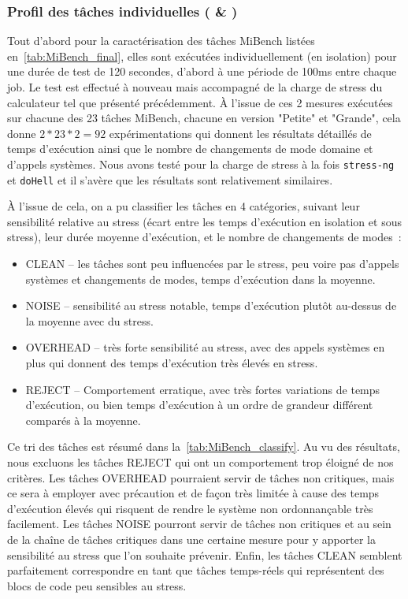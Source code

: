\documentclass[french, a4paper, 11pt, twoside, pdftex]{StyleThese}
\begin{document}
\subsubsection{Profil des tâches individuelles ( \& )}
Tout d'abord pour la caractérisation des tâches MiBench listées en~\autoref{tab:MiBench_final}, elles sont exécutées individuellement (en isolation) pour une durée de test de 120 secondes, d'abord à une période de 100ms entre chaque job. Le test est effectué à nouveau mais accompagné de la charge de stress du calculateur tel que présenté précédemment. À l'issue de ces 2 mesures exécutées sur chacune des 23 tâches MiBench, chacune en version "Petite" et "Grande", cela donne $2*23*2 = 92$ expérimentations qui donnent les résultats détaillés de temps d'exécution ainsi que le nombre de changements de mode domaine et d'appels systèmes. Nous avons testé pour la charge de stress à la fois \texttt{stress-ng} et \texttt{doHell} et il s'avère que les résultats sont relativement similaires.

À l'issue de cela, on a pu classifier les tâches en 4 catégories, suivant leur sensibilité relative au stress (écart entre les temps d'exécution en isolation et sous stress), leur durée moyenne d'exécution, et le nombre de changements de modes~: 
\begin{itemize}
	\item CLEAN -- les tâches sont peu influencées par le stress, peu voire pas d'appels systèmes et changements de modes, temps d'exécution dans la moyenne.
	\item NOISE -- sensibilité au stress notable, temps d'exécution plutôt au-dessus de la moyenne avec du stress.
	\item OVERHEAD -- très forte sensibilité au stress, avec des appels systèmes en plus qui donnent des temps d'exécution très élevés en stress.
	\item REJECT -- Comportement erratique, avec très fortes variations de temps d'exécution, ou bien temps d'exécution à un ordre de grandeur différent comparés à la moyenne.
\end{itemize}
Ce tri des tâches est résumé dans la~\autoref{tab:MiBench_classify}. Au vu des résultats, nous excluons les tâches REJECT qui ont un comportement trop éloigné de nos critères. Les tâches OVERHEAD pourraient servir de tâches non critiques, mais ce sera à employer avec précaution et de façon très limitée à cause des temps d'exécution élevés qui risquent de rendre le système non ordonnançable très facilement. Les tâches NOISE pourront servir de tâches non critiques et au sein de la chaîne de tâches critiques dans une certaine mesure pour y apporter la sensibilité au stress que l'on souhaite prévenir. Enfin, les tâches CLEAN semblent parfaitement correspondre en tant que tâches temps-réels qui représentent des blocs de code peu sensibles au stress. 
 \smallbreak 
 
\end{document}
